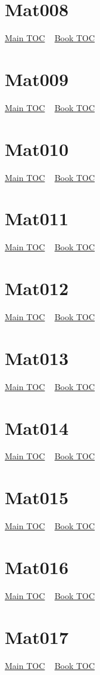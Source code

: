 \documentclass{book}
\begin{document}
  \section{Mat008}\hyperlink{toc}{Main TOC} ~ \hyperref[subsec:Mat]{Book TOC} 
  \section{Mat009}\hyperlink{toc}{Main TOC} ~ \hyperref[subsec:Mat]{Book TOC} 
  \section{Mat010}\hyperlink{toc}{Main TOC} ~ \hyperref[subsec:Mat]{Book TOC} 
  \section{Mat011}\hyperlink{toc}{Main TOC} ~ \hyperref[subsec:Mat]{Book TOC} 
  \section{Mat012}\hyperlink{toc}{Main TOC} ~ \hyperref[subsec:Mat]{Book TOC} 
  \section{Mat013}\hyperlink{toc}{Main TOC} ~ \hyperref[subsec:Mat]{Book TOC} 
  \section{Mat014}\hyperlink{toc}{Main TOC} ~ \hyperref[subsec:Mat]{Book TOC} 
  \section{Mat015}\hyperlink{toc}{Main TOC} ~ \hyperref[subsec:Mat]{Book TOC} 
  \section{Mat016}\hyperlink{toc}{Main TOC} ~ \hyperref[subsec:Mat]{Book TOC} 
  \section{Mat017}\hyperlink{toc}{Main TOC} ~ \hyperref[subsec:Mat]{Book TOC} 
\end{document}
